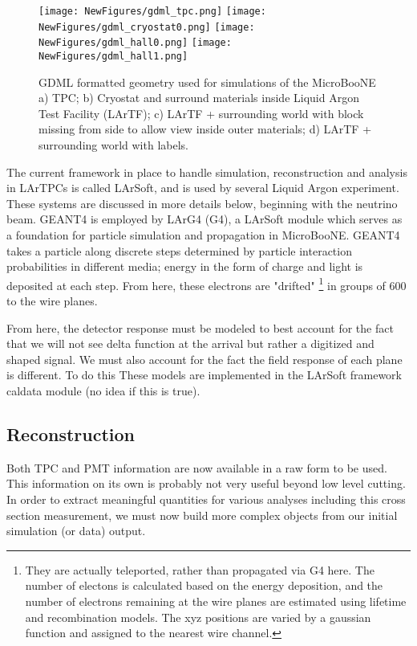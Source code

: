 \documentclass[12pt]{article}
\begin{document}
\begin{figure}[h!]
\centering
\texttt{[image: NewFigures/gdml\_tpc.png]}
\hspace{2 mm}
\texttt{[image: NewFigures/gdml\_cryostat0.png]}
\hspace{2 mm}
\texttt{[image: NewFigures/gdml\_hall0.png]}
\hspace{2 mm}
\texttt{[image: NewFigures/gdml\_hall1.png]}
\caption{GDML formatted geometry used for simulations of the MicroBooNE a) TPC; b) Cryostat and surround materials inside Liquid Argon Test Facility (LArTF); c) LArTF + surrounding world with block missing from side to allow view inside outer materials; d) LArTF + surrounding world with labels. }
\label{fig:gdml}
\end{figure}

\par The current framework in place to handle simulation, reconstruction and analysis in LArTPCs is called LArSoft, and is used by several Liquid Argon experiment.  These systems are discussed in more details below, beginning with the neutrino beam. GEANT4 is employed by LArG4 (G4), a LArSoft module which serves as a foundation for particle simulation and propagation in MicroBooNE. GEANT4 takes a particle along discrete steps determined by particle interaction probabilities in different media; energy in the form of charge and light is deposited at each step.  From here, these electrons are "drifted" \footnote{They are actually teleported, rather than propagated via G4 here.  The number of electons is calculated based on the energy deposition, and the number of electrons remaining at the wire planes are estimated using lifetime and recombination models.  The xyz positions are varied by a gaussian function and assigned to the nearest wire channel. } in groups of 600 to the wire planes.
\par From here, the detector response must be modeled to best account for the fact that we will not see delta function at the arrival but rather a digitized and shaped signal. We must also account for the fact the field response of each plane is different. To do this  These models are implemented in the LArSoft framework caldata module (no idea if this is true). 

\subsection{Reconstruction}
Both TPC and PMT information are now available in a raw form to be used. This information on its own is probably not very useful beyond low level cutting.  In order to extract meaningful quantities for various analyses including this cross section measurement, we must now build more complex objects from our initial simulation (or data) output.
\end{document}
